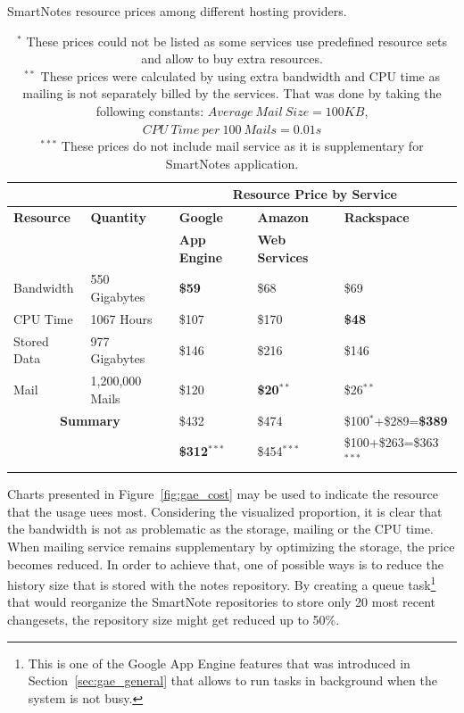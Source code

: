 \begin{table}[h]
\centering
\caption{SmartNotes resource prices among different hosting providers.}
\caption*{ $^{*}$ These prices could not be listed as some services use predefined resource sets and allow to buy extra resources.\\
 $^{**}$ These prices were calculated by using extra bandwidth and CPU time as mailing is not separately billed by the services. That was done by taking the following constants: $Average\ Mail\ Size = 100KB$, $CPU\ Time\ per\ 100\ Mails = 0.01s$\\
 $^{***}$ These prices do not include mail service as it is supplementary for SmartNotes application.}
\label{tab:services_price_compare}
\begin{tabular}{|l|l|l|l|l|} \cline{3-5}
                              \multicolumn{2}{c|}{}       &\multicolumn{3}{c|}{\textbf{Resource Price by Service}} \\ \hline \hline
\textbf{Resource} &\textbf{Quantity} &\textbf{Google}        &\textbf{Amazon}         &\textbf{Rackspace} \\
                                               &                                             &\textbf{App Engine} &\textbf{Web Services} &  \\ \hline \hline
Bandwidth &550 Gigabytes &\textbf{\$59} &\$68 &\$69 \\ \hline
CPU Time &1067 Hours &\$107 &\$170 &\textbf{\$48}\\ \hline
Stored Data &977 Gigabytes &\$146 & \$216 &\$146 \\ \hline
Mail &1,200,000 Mails &\$120 &\textbf{\$20}$^{**}$ &\$26$^{**}$ \\ \hline \hline
\multicolumn{2}{|c|}{\textbf{Summary}} &\$432 &\$474 &\$100$^{*}$+\$289=\textbf{\$389}\\
\multicolumn{2}{|c|}{} &\textbf{\$312}$^{***}$ &\$454$^{***}$ &\$100+\$263=\$363$^{***}$\\ \hline \hline
\end{tabular}
\end{table}
 
Charts presented in Figure~\ref{fig:gae_cost} may be used to indicate the resource that the usage uees most. Considering the visualized proportion, it is clear that the bandwidth is not as problematic as the storage, mailing or the CPU time. When mailing service remains supplementary by optimizing the storage, the price becomes reduced. In order to achieve that, one of possible ways is to reduce the history size that is stored with the notes repository. By creating a queue task\footnote{This is one of the Google App Engine features that was introduced in Section~\ref{sec:gae_general} that allows to run tasks in background when the system is not busy.} that would reorganize the SmartNote repositories to store only 20 most recent changesets, the repository size might get reduced up to 50\%.     
 
